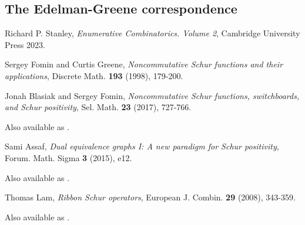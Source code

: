 \documentclass{article}
\begin{document}
\subsection{The Edelman-Greene correspondence}

\begin{thebibliography}{999999}
    \raggedright\footnotesize

    Richard P. Stanley, 
    \textit{Enumerative Combinatorics. Volume 2}, 
    Cambridge University Press 2023.

    Sergey Fomin and Curtis Greene, 
    \textit{Noncommutative Schur functions and their applications}, 
    Discrete Math. \textbf{193} (1998), 179-200.

    Jonah Blasiak and Sergey Fomin, 
    \textit{Noncommutative Schur functions, switchboards, and Schur positivity},
    Sel. Math. \textbf{23} (2017), 727-766.

    Also available as .

    Sami Assaf,
    \textit{Dual equivalence graphs I: A new paradigm for Schur positivity},
    Forum. Math. Sigma \textbf{3} (2015), e12.

    Also available as .

    Thomas Lam,
    \textit{Ribbon Schur operators},
    European J. Combin. \textbf{29} (2008), 343-359.

    Also available as .



\end{thebibliography}
\end{document}

